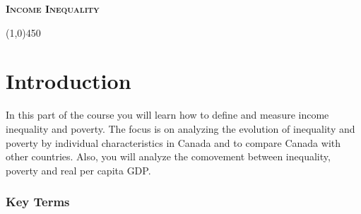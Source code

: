\documentclass[letterpaper]{article}\usepackage[]{graphicx}\usepackage[]{color}
\numberwithin{exer}{section}
\theoremstyle{nonumberplain}
\begin{document}
\noindent
 \textsc{\Large \textbf{Income Inequality}}\\[.1cm]
 \begin{center}
   \line(1,0){450}\\[0.2cm]
   \end{center}


\tableofcontents

\section{Introduction}\label{sec:intro}
In this part of the course you will learn how to define and measure income
inequality and poverty. The focus is on analyzing the evolution of
inequality and poverty by individual characteristics in Canada and to
compare Canada with other countries. Also, you will analyze the
comovement between inequality, poverty and real per capita GDP.




\subsubsection*{Key Terms}
  
\end{document}
